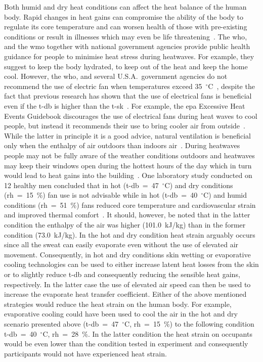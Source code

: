 Both humid and dry heat conditions can affect the heat balance of the human body.
Rapid changes in heat gains can compromise the ability of the body to regulate its core temperature and can worsen health of those with pre-existing conditions or result in illnesses which may even be life threatening~\cite{WMO2015}.
The \ac{who}, and the \ac{wmo} together with national government agencies provide public health guidance for people to minimise heat stress during heatwaves.
For example, they suggest to keep the body hydrated, to keep out of the heat and keep the home cool.
However, the \ac{who}, and several U.S.A.\ government agencies do not recommend the use of electric fan when temperatures exceed 35~$^{\circ}$C~\cite{ExtremeH66:online, Frequent18:online, HeatandH28:online, WMO2015}, despite the fact that previous research has shown that the use of electrical fans is beneficial even if the \ac{t-db} is higher than the \ac{t-sk}~\cite{Jay2015, Jay2019a, Rate2015}.
For example, the \ac{epa} Excessive Heat Events Guidebook discourages the use of electrical fans during heat waves to cool people, but instead it recommends their use to bring cooler air from outside~\cite{UnitedStatesEnvironmentalProtectionAgency2006}.
While the latter in principle it is a good advice, natural ventilation is beneficial only when the enthalpy of air outdoors than indoors air~\cite{Fiorentini2019}\@.
During heatwaves people may not be fully aware of the weather conditions outdoors and heatwaves may keep their windows open during the hottest hours of the day which in turn would lead to heat gains into the building~\cite{Tartarini2017}.
One laboratory study conducted on 12 healthy men concluded that in hot (\ac{t-db}~=~47~$^{\circ}$C) and dry conditions (\ac{rh}~=~15~\%) fan use is not advisable while in hot (\ac{t-db}~=~40~$^{\circ}$C) and humid conditions (\ac{rh}~=~51~\%) fans reduced core temperature and cardiovascular strain and improved thermal comfort~\cite{Morris2019}.
It should, however, be noted that in the latter condition the enthalpy of the air was higher (101.0~kJ/kg) than in the former condition (73.0~kJ/kg).
In the hot and dry condition heat strain arguably occurs since all the sweat can easily evaporate even without the use of elevated air movement.
Consequently, in hot and dry conditions skin wetting or evaporative cooling technologies can be used to either increase latent heat losses from the skin or to slightly reduce \ac{t-db} and consequently reducing the sensible heat gains, respectively.
In the latter case the use of elevated air speed can then be used to increase the evaporate heat transfer coefficient.
Either of the above mentioned strategies would reduce the heat strain on the human body.
For example, evaporative cooling could have been used to cool the air in the hot and dry scenario presented above (\ac{t-db}~=~47~$^{\circ}$C, \ac{rh}~=~15~\%) to the following condition \ac{t-db}~=~40~$^{\circ}$C, \ac{rh}~=~28~\%\@.
In the latter condition the heat strain on occupants would be even lower than the condition tested in  experiment and consequently participants would not have experienced heat strain.

